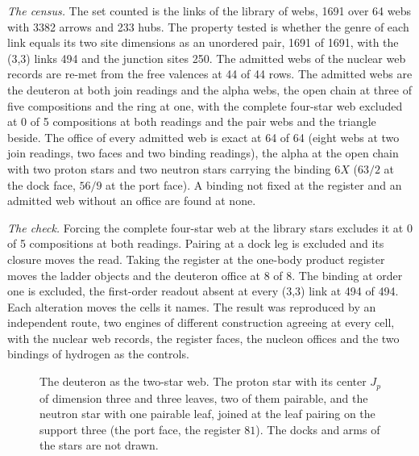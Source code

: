 \begin{chproof}
\textit{The census.} The set counted is the links of the library of webs, 1691 over 64 webs with 3382 arrows and 233 hubs. The property tested is whether the genre of each link equals its two site dimensions as an unordered pair, 1691 of 1691, with the (3,3) links 494 and the junction sites 250. The admitted webs of the nuclear web records are re-met from the free valences at 44 of 44 rows. The admitted webs are the deuteron at both join readings and the alpha webs, the open chain at three of five compositions and the ring at one, with the complete four-star web excluded at 0 of 5 compositions at both readings and the pair webs and the triangle beside. The office of every admitted web is exact at 64 of 64 (eight webs at two join readings, two faces and two binding readings), the alpha at the open chain with two proton stars and two neutron stars carrying the binding $6X$ ($63/2$ at the dock face, $56/9$ at the port face). A binding not fixed at the register and an admitted web without an office are found at none.

\textit{The check.} Forcing the complete four-star web at the library stars excludes it at 0 of 5 compositions at both readings. Pairing at a dock leg is excluded and its closure moves the read. Taking the register at the one-body product register moves the ladder objects and the deuteron office at 8 of 8. The binding at order one is excluded, the first-order readout absent at every (3,3) link at 494 of 494. Each alteration moves the cells it names. The result was reproduced by an independent route, two engines of different construction agreeing at every cell, with the nuclear web records, the register faces, the nucleon offices and the two bindings of hydrogen as the controls.
\end{chproof}
\begin{figure}[h]
\centering
{}
\caption{The deuteron as the two-star web. The proton star with its center $J_p$ of dimension three and three leaves, two of them pairable, and the neutron star with one pairable leaf, joined at the leaf pairing on the support three (the port face, the register $81$). The docks and arms of the stars are not drawn.}
\end{figure}

